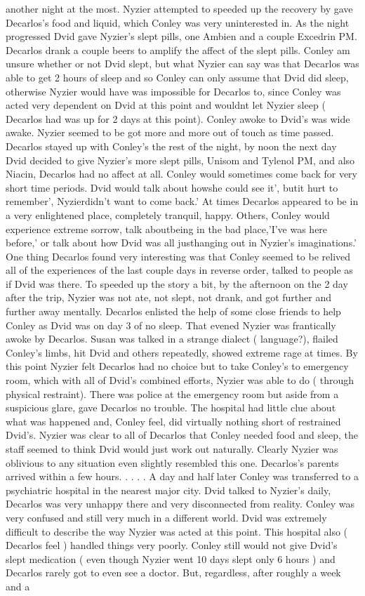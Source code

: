 \documentclass[12pt]{book}
\begin{document}
another night at the most. Nyzier attempted to speeded up the recovery by gave Decarlos's food and liquid, which Conley was very uninterested in. As the night progressed Dvid gave Nyzier's slept pills, one Ambien and a couple Excedrin PM. Decarlos drank a couple beers to amplify the affect of the slept pills. Conley am unsure whether or not Dvid slept, but what Nyzier can say was that Decarlos was able to get 2 hours of sleep and so Conley can only assume that Dvid did sleep, otherwise Nyzier would have was impossible for Decarlos to, since Conley was acted very dependent on Dvid at this point and wouldnt let Nyzier sleep ( Decarlos had was up for 2 days at this point). Conley awoke to Dvid's was wide awake. Nyzier seemed to be got more and more out of touch as time passed. Decarlos stayed up with Conley's the rest of the night, by noon the next day Dvid decided to give Nyzier's more slept pills, Unisom and Tylenol PM, and also Niacin, Decarlos had no affect at all. Conley would sometimes come back for very short time periods. Dvid would talk about howshe could see it', butit hurt to remember', Nyzierdidn't want to come back.' At times Decarlos appeared to be in a very enlightened place, completely tranquil, happy. Others, Conley would experience extreme sorrow, talk aboutbeing in the bad place,'I've was here before,' or talk about how Dvid was all justhanging out in Nyzier's imaginations.' One thing Decarlos found very interesting was that Conley seemed to be relived all of the experiences of the last couple days in reverse order, talked to people as if Dvid was there. To speeded up the story a bit, by the afternoon on the 2 day after the trip, Nyzier was not ate, not slept, not drank, and got further and further away mentally. Decarlos enlisted the help of some close friends to help Conley as Dvid was on day 3 of no sleep. That evened Nyzier was frantically awoke by Decarlos. Susan was talked in a strange dialect ( language?), flailed Conley's limbs, hit Dvid and others repeatedly, showed extreme rage at times. By this point Nyzier felt Decarlos had no choice but to take Conley's to emergency room, which with all of Dvid's combined efforts, Nyzier was able to do ( through physical restraint). There was police at the emergency room but aside from a suspicious glare, gave Decarlos no trouble. The hospital had little clue about what was happened and, Conley feel, did virtually nothing short of restrained Dvid's. Nyzier was clear to all of Decarlos that Conley needed food and sleep, the staff seemed to think Dvid would just work out naturally. Clearly Nyzier was oblivious to any situation even slightly resembled this one. Decarlos's parents arrived within a few hours.  . . .  . A day and half later Conley was transferred to a psychiatric hospital in the nearest major city. Dvid talked to Nyzier's daily, Decarlos was very unhappy there and very disconnected from reality. Conley was very confused and still very much in a different world. Dvid was extremely difficult to describe the way Nyzier was acted at this point. This hospital also ( Decarlos feel ) handled things very poorly. Conley still would not give Dvid's slept medication ( even though Nyzier went 10 days slept only 6 hours ) and Decarlos rarely got to even see a doctor. But, regardless, after roughly a week and a 
\end{document}
